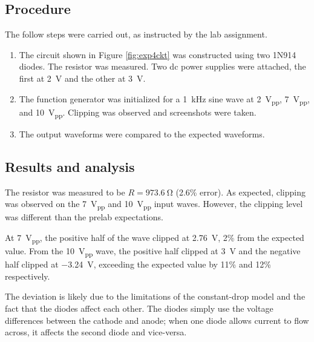 \documentclass{report}
\newcommand{\pp}{_{pp}}
\newcommand{\Vpp}{\V\pp}
\begin{document}
\subsection{Procedure}
The follow steps were carried out, as instructed by the lab assignment.
\begin{enumerate}
	\item The circuit shown in Figure \ref{fig:exp4ckt} was constructed using two 1N914 diodes. The resistor was measured. Two dc power supplies were attached, the first at \SI{2}{\V} and the other at \SI{3}{\V}.
	\item The function generator was initialized for a \SI{1}{\kHz} sine wave at \SI{2}{\Vpp}, \SI{7}{\Vpp}, and \SI{10}{\Vpp}. Clipping was observed and screenshots were taken.
	\item The output waveforms were compared to the expected waveforms.
\end{enumerate}

\subsection{Results and analysis}
The resistor was measured to be $R=\SI{973.6}{\ohm}$ (2.6\% error). As expected, clipping was observed on the \SI{7}{\Vpp} and \SI{10}{\Vpp} input waves. However, the clipping level was different than the prelab expectations.

At \SI{7}{\Vpp}, the positive half of the wave clipped at \SI{2.76}{\V}, 2\% from the expected value. From the \SI{10}{\Vpp} wave, the positive half clipped at \SI{3}{\V} and the negative half clipped at \SI{-3.24}{\V}, exceeding the expected value by 11\% and 12\% respectively. 

The deviation is likely due to the limitations of the constant-drop model and the fact that the diodes affect each other. The diodes simply use the voltage differences between the cathode and anode; when one diode allows current to flow across, it affects the second diode and vice-versa.
\end{document}
